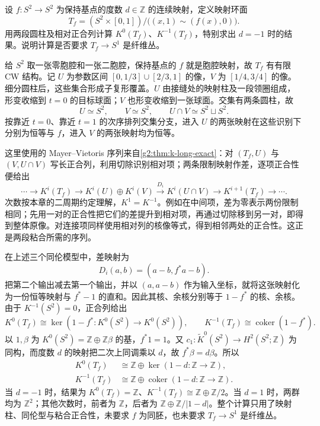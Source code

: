 \begin{exercise}\label{g2:ex:k-mapping-torus-degree}
	设 \(f:S^2\to S^2\) 为保持基点的度数 \(d\in\mathbb Z\) 的连续映射，定义映射环面
	\[
		T_f=(S^2\times[0,1])/\bigl((x,1)\sim(f(x),0)\bigr).
	\]
	用两段圆柱及相对正合列计算 \(K^0(T_f)\)、\(K^{-1}(T_f)\)，特别求出 \(d=-1\) 时的结果。说明计算是否要求 \(T_f\to S^1\) 是纤维丛。
\end{exercise}
\begin{solution}
	给 \(S^2\) 取一张零胞腔和一张二胞腔，保持基点的 \(f\) 就是胞腔映射，故 \(T_f\) 有有限 CW 结构。记 \(U\) 为参数区间 \([0,1/3]\cup[2/3,1]\) 的像，\(V\) 为 \([1/4,3/4]\) 的像。细分圆柱后，这些集合形成子复形覆盖。\(U\) 由接缝处的映射柱及一段领圈组成，形变收缩到 \(t=0\) 的目标球面；\(V\) 也形变收缩到一张球面。交集有两条圆柱，故
	\[
		U\simeq S^2,\qquad V\simeq S^2,\qquad U\cap V\simeq S^2\sqcup S^2.
	\]
	按靠近 \(t=0\)、靠近 \(t=1\) 的次序排列交集分支，进入 \(U\) 的两张映射在这些识别下分别为恒等与 \(f\)，进入 \(V\) 的两张映射均为恒等。

	这里使用的 Mayer--Vietoris 序列来自\cref{g2:thm:k-long-exact}：对 \((T_f,U)\) 与 \((V,U\cap V)\) 写长正合列，利用切除识别相对项；两条限制映射作差，逐项正合性便给出
	\[
		\cdots\longrightarrow K^i(T_f)\longrightarrow K^i(U)\oplus K^i(V)
		\xrightarrow{D_i}K^i(U\cap V)\longrightarrow K^{i+1}(T_f)\longrightarrow\cdots.
	\]
	次数按本章的二周期约定理解，\(K^1=K^{-1}\)。例如在中间项，差为零表示两份限制相同；先用一对的正合性把它们的差提升到相对项，再通过切除移到另一对，即得到整体原像。对连接项同样使用相对列的核像等式，得到相邻两处的正合性。这正是两段粘合所需的序列。

	在上述三个同伦模型中，差映射为
	\[
		D_i(a,b)=(a-b,f^*a-b).
	\]
	把第二个输出减去第一个输出，并以 \((a,a-b)\) 作为输入坐标，就将这张映射化为一份恒等映射与 \(f^*-1\) 的直和。因此其核、余核分别等于 \(1-f^*\) 的核、余核。由于 \(K^{-1}(S^2)=0\)，正合列给出
	\[
		K^0(T_f)\cong\ker(1-f^*:K^0(S^2)\to K^0(S^2)),\qquad
		K^{-1}(T_f)\cong\operatorname{coker}(1-f^*).
	\]
	以 \(1,\beta\) 为 \(K^0(S^2)=\mathbb Z\oplus\mathbb Z\beta\) 的基，\(f^*1=1\)。又 \(c_1:\widetilde K^0(S^2)\to H^2(S^2;\mathbb Z)\) 为同构，而度数 \(d\) 的映射把二次上同调乘以 \(d\)，故 \(f^*\beta=d\beta\)。所以
	\[
	\begin{aligned}
		K^0(T_f)&\cong\mathbb Z\oplus\ker(1-d:\mathbb Z\to\mathbb Z),\\
		K^{-1}(T_f)&\cong\mathbb Z\oplus\operatorname{coker}(1-d:\mathbb Z\to\mathbb Z).
	\end{aligned}
	\]
	当 \(d=-1\) 时，结果为 \(K^0(T_f)=\mathbb Z\)、\(K^{-1}(T_f)\cong\mathbb Z\oplus\mathbb Z/2\)。当 \(d=1\) 时，两群均为 \(\mathbb Z^2\)；其他次数时，前者为 \(\mathbb Z\)，后者为 \(\mathbb Z\oplus\mathbb Z/|1-d|\)。整个计算只用了映射柱、同伦型与粘合正合性，未要求 \(f\) 为同胚，也未要求 \(T_f\to S^1\) 是纤维丛。
\end{solution}

